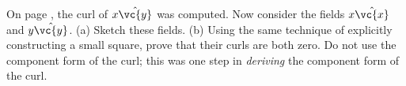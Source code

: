         On page \pageref{curlxy}, the curl of $x\hat{\vc{y}}$ was computed.
        Now consider the fields $x\hat{\vc{x}}$ and $y\hat{\vc{y}}$.\hwendpart
        (a) Sketch these fields.\hwendpart
        (b) Using the same technique of explicitly constructing a small square,
        prove that their curls are both zero.
        Do not use the component form of the curl; this was one step in \emph{deriving}
        the component form of the curl.
